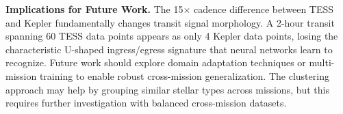 \textbf{Implications for Future Work.} The 15$\times$ cadence difference between TESS and Kepler fundamentally changes transit signal morphology. A 2-hour transit spanning 60 TESS data points appears as only 4 Kepler data points, losing the characteristic U-shaped ingress/egress signature that neural networks learn to recognize. Future work should explore domain adaptation techniques or multi-mission training to enable robust cross-mission generalization. The clustering approach may help by grouping similar stellar types across missions, but this requires further investigation with balanced cross-mission datasets.
